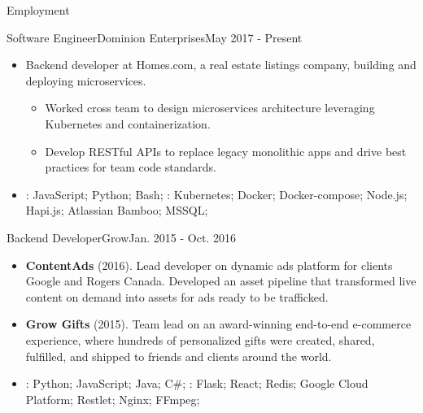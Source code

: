 \documentclass[]{mcdowellcv}
\begin{document}
    \makeheader

    \begin{cvsection}{Employment}

        \begin{cvsubsection}{Software Engineer}{Dominion Enterprises}{May 2017 - Present}
            \begin{itemize}
                \item Backend developer at Homes.com, a real estate listings company, building and deploying microservices.
                \begin{itemize}
                    \item Worked cross team to design microservices architecture leveraging Kubernetes and containerization.
                    \item Develop RESTful APIs to replace legacy monolithic apps and drive best practices for team code standards.  
                \end{itemize}
            \end{itemize}
            \begin{itemize}
                 \item {}: JavaScript; Python; Bash;  \newline
                : Kubernetes; Docker; Docker-compose; Node.js; Hapi.js; Atlassian Bamboo; MSSQL;
            \end{itemize}
        \end{cvsubsection}

        \begin{cvsubsection}{Backend Developer}{Grow}{Jan. 2015 - Oct. 2016}
            \begin{itemize}
                \item \textbf{ContentAds} (2016). Lead developer on dynamic ads platform for clients Google and Rogers Canada. Developed an asset pipeline that transformed live content on demand into assets for ads ready to be trafficked.
            \end{itemize}
            \begin{itemize}
                \item \textbf{Grow Gifts} (2015). Team lead on an award-winning end-to-end e-commerce experience, where hundreds of personalized gifts were created, shared, fulfilled, and shipped to friends and clients around the world.
            \end{itemize}
            \begin{itemize}
                 \item {}: Python; JavaScript; Java; C\#; \newline
                : Flask; React; Redis; Google Cloud Platform; Restlet; Nginx; FFmpeg;
            \end{itemize}
        \end{cvsubsection}


\end{cvsection}
\end{document}
